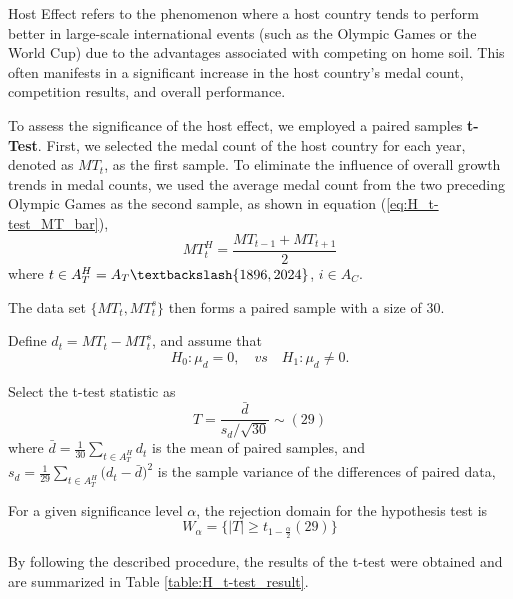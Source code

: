 \documentclass{mcmthesis}
\begin{document}
Host Effect refers to the phenomenon where a host country tends to perform better in large-scale international events (such as the Olympic Games or the World Cup) due to the advantages associated with competing on home soil. This often manifests in a significant increase in the host country's medal count, competition results, and overall performance.

	
	To assess the significance of the host effect, we employed a paired samples  \textbf{t-Test}. First, we selected the medal count of the host country for each year, denoted as $MT_{t}$, as the first sample. To eliminate the influence of overall growth trends in medal counts, we used the average medal count from the two preceding Olympic Games as the second sample, as shown in equation (\ref{eq:H_t-test_MT_bar}),
	\begin{equation}
		MT^H_{t}=\frac{ MT_{t-1} + MT_{t+1} }{2}
		\label{eq:H_t-test_MT_bar}
	\end{equation}
	where $t\in A_T^H = A_T \textbackslash \{1896,2024\}$, $i\in A_{C}$. 
	
	The data set $\{MT_{t},MT^s_{t}\}$ then forms a paired sample with a size of 30. 
	
	Define $d_t= MT_{t} - MT^s_{t}$, and assume that
	\begin{equation*}
		H_0: \mu_d=0, \quad vs \quad H_1:  \mu_d \ne 0.
	\end{equation*}
	
	Select the t-test statistic as
	\begin{equation}
		T=\frac{ \bar{d} }{ s_d\slash \sqrt{30} } \sim (29)
	\end{equation}
	where $\bar{d}=\frac{1}{30} \sum_{t\in A_T^H} d_t$ is the mean of paired samples, 
	and $ s_d = \frac{1}{29} \sum_{t\in A_T^H}\big( d_t - \bar{d} \big)^2 $ is the sample variance of the differences of paired data, 
	
	For a given significance level $\alpha$, the rejection domain for the hypothesis test is
	\begin{equation}
		W_\alpha = \big\{ |T| \ge t_{1-\frac{\alpha}{2}}(29) \big\}
	\end{equation}
	
	By following the described procedure, the results of the t-test were obtained and are summarized in Table \ref{table:H_t-test_result}.
	
\end{document}
